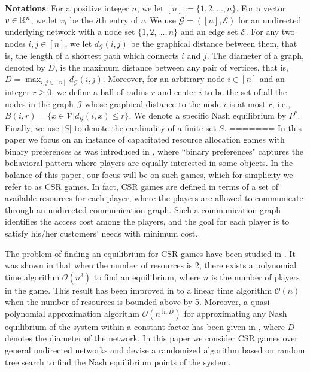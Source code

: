 \textbf{Notations}:
For a positive integer $n$, we let $[n]:=\{1,2,\ldots,n\}$. For a vector $v\in \mathbb{R}^n$, we let $v_i$ be the $i$th entry of $v$. We use $\mathcal{G}=([n], \mathcal{E})$ for an undirected underlying network with a node set $\{1,2,\ldots,n\}$ and an edge set $\mathcal{E}$. For any two nodes $i, j \in [n]$, we let $d_{\mathcal{G}}(i,j)$ be the graphical distance between them, that is, the length of a shortest path which connects $i$ and $j$. The diameter of a graph, denoted by $D$, is the maximum distance between any pair of vertices, that is, $D=\max_{i,j \in [n]} d_{\mathcal{G}}(i,j)$. Moreover, for an arbitrary node $i\in [n]$ and an integer $r\ge 0$, we define a ball of radius $r$ and center $i$ to be the set of all the nodes in the graph $\mathcal{G}$ whose graphical distance to the node $i$ is at most $r$, i.e., $B(i,r)=\{x\in \mathcal{V}| d_{\mathcal{G}}(i,x)\leq r\}$. We denote a specific Nash equilibrium by $P^*$. Finally, we use $|S|$ to denote the cardinality of a finite set $S$.
=======
In this paper we focus on an instance of capacitated resource allocation games with binary preferences as was introduced in \cite{gopalakrishnan2012cache}, where ``binary preferences" captures the behavioral pattern where players are equally interested in some objects. In the balance of this paper, our focus will be on such games, which for simplicity we refer to as CSR games. In fact, CSR games are defined in terms of a set of available resources for each player, where the players are allowed to communicate through an undirected communication graph. Such a communication graph identifies the access cost among the players, and the goal for each player is to satisfy his/her customers' needs with minimum cost. 

The problem of finding an equilibrium for CSR games have been studied in \cite{gopalakrishnan2012cache,etesami2014pure}. It was shown in \cite{gopalakrishnan2012cache} that when the number of resources is 2, there exists a polynomial time algorithm $\mathcal{O}(n^3)$ to find an equilibrium, where $n$ is the number of players in the game. This result has been improved in \cite{etesami2014pure} to a linear time algorithm $\mathcal{O}(n)$ when the number of resources is bounded above by 5. Moreover, a quasi-polynomial approximation algorithm $\mathcal{O}(n^{\ln D})$ for approximating any Nash equilibrium of the system within a constant factor has been given in \cite{etesami2015approximation}, where $D$ denotes the diameter of the network. In this paper we consider CSR games over general undirected networks and devise a randomized algorithm based on random tree search to find the Nash equilibrium points of the system.
 
